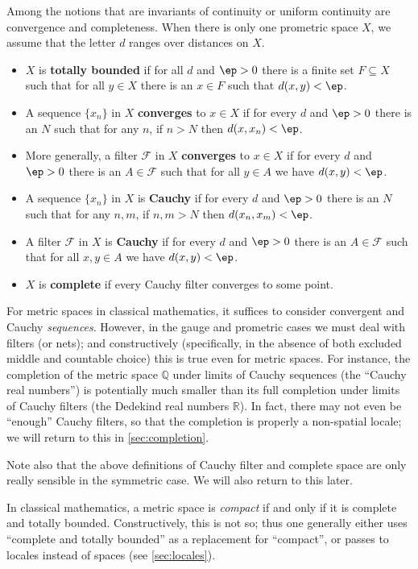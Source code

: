 \documentclass{article}
\def\R{\mathbb{R}}
\def\F{\mathcal{F}}
\begin{document}
Among the notions that are invariants of continuity or uniform continuity are convergence and completeness.
When there is only one prometric space $X$, we assume that the letter $d$ ranges over distances on $X$.

\begin{itemize}
\item $X$ is \textbf{totally bounded} if for all $d$ and $\ep>0$ there is a finite set $F\subseteq X$ such that for all $y\in X$ there is an $x\in F$ such that $d(x,y)<\ep$.
\item A sequence $\{x_n\}$ in $X$ \textbf{converges} to $x\in X$ if for every $d$ and $\ep>0$ there is an $N$ such that for any $n$, if $n>N$ then $d(x,x_n)<\ep$.
\item More generally, a filter $\F$ in $X$ \textbf{converges} to $x\in X$ if for every $d$ and $\ep>0$ there is an $A\in\F$ such that for all $y\in A$ we have $d(x,y)<\ep$.
\item A sequence $\{x_n\}$ in $X$ is \textbf{Cauchy} if for every $d$ and $\ep>0$ there is an $N$ such that for any $n,m$, if $n,m>N$ then $d(x_n,x_m)<\ep$.
\item A filter $\F$ in $X$ is \textbf{Cauchy} if for every $d$ and $\ep>0$ there is an $A\in\F$ such that for all $x,y\in A$ we have $d(x,y)<\ep$.
\item $X$ is \textbf{complete} if every Cauchy filter converges to some point.
\end{itemize}

For metric spaces in classical mathematics, it suffices to consider convergent and Cauchy \emph{sequences}.
However, in the gauge and prometric cases we must deal with filters (or nets); and constructively (specifically, in the absence of both excluded middle and countable choice) this is true even for metric spaces.
For instance, the completion of the metric space $\mathbb{Q}$ under limits of Cauchy sequences (the ``Cauchy real numbers'') is potentially much smaller than its full completion under limits of Cauchy filters (the Dedekind real numbers $\R$).
In fact, there may not even be ``enough'' Cauchy filters, so that the completion is properly a non-spatial locale; we will return to this in \cref{sec:completion}.

Note also that the above definitions of Cauchy filter and complete space are only really sensible in the symmetric case.
We will also return to this later.

In classical mathematics, a metric space is \emph{compact} if and only if it is complete and totally bounded.
Constructively, this is not so; thus one generally either uses ``complete and totally bounded'' as a replacement for ``compact'', or passes to locales instead of spaces (see \cref{sec:locales}).
\end{document}
